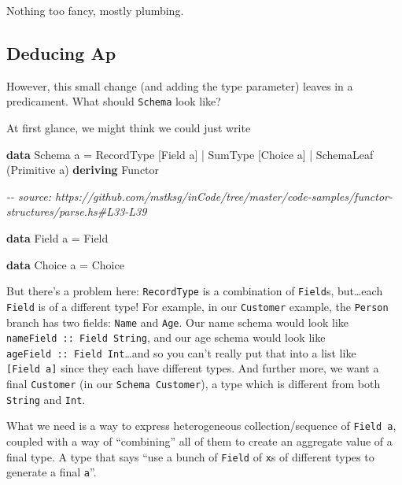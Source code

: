 \documentclass[]{article}
\newenvironment{Shaded}{}{}
\newcommand{\CommentTok}[1]{\textcolor[rgb]{0.38,0.63,0.69}{\textit{#1}}}
\newcommand{\DataTypeTok}[1]{\textcolor[rgb]{0.56,0.13,0.00}{#1}}
\newcommand{\KeywordTok}[1]{\textcolor[rgb]{0.00,0.44,0.13}{\textbf{#1}}}
\newcommand{\NormalTok}[1]{#1}
\newcommand{\OperatorTok}[1]{\textcolor[rgb]{0.40,0.40,0.40}{#1}}
\newcommand{\OtherTok}[1]{\textcolor[rgb]{0.00,0.44,0.13}{#1}}
\begin{document}
Nothing too fancy, mostly plumbing.

\hypertarget{deducing-ap}{%
\subsection{Deducing Ap}\label{deducing-ap}}

However, this small change (and adding the type parameter) leaves in a
predicament. What should \texttt{Schema} look like?

At first glance, we might think we could just write

\begin{Shaded}
\begin{Highlighting}[]
\KeywordTok{data} \DataTypeTok{Schema}\NormalTok{ a }\OtherTok{=}
      \DataTypeTok{RecordType}\NormalTok{  [}\DataTypeTok{Field}\NormalTok{ a]}
    \OperatorTok{|} \DataTypeTok{SumType}\NormalTok{     [}\DataTypeTok{Choice}\NormalTok{ a]}
    \OperatorTok{|} \DataTypeTok{SchemaLeaf}\NormalTok{  (}\DataTypeTok{Primitive}\NormalTok{ a)}
  \KeywordTok{deriving} \DataTypeTok{Functor}

\CommentTok{{-}{-} source: https://github.com/mstksg/inCode/tree/master/code{-}samples/functor{-}structures/parse.hs\#L33{-}L39}

\KeywordTok{data} \DataTypeTok{Field}\NormalTok{ a }\OtherTok{=} \DataTypeTok{Field}

\KeywordTok{data} \DataTypeTok{Choice}\NormalTok{ a }\OtherTok{=} \DataTypeTok{Choice}
\end{Highlighting}
\end{Shaded}

But there's a problem here: \texttt{RecordType} is a combination of
\texttt{Field}s, but\ldots each \texttt{Field} is of a different type! For
example, in our \texttt{Customer} example, the \texttt{Person} branch has two
fields: \texttt{Name} and \texttt{Age}. Our name schema would look like
\texttt{nameField\ ::\ Field\ String}, and our age schema would look like
\texttt{ageField\ ::\ Field\ Int}\ldots and so you can't really put that into a
list like \texttt{{[}Field\ a{]}} since they each have different types. And
further more, we want a final \texttt{Customer} (in our
\texttt{Schema\ Customer}), a type which is different from both \texttt{String}
and \texttt{Int}.

What we need is a way to express heterogeneous collection/sequence of
\texttt{Field\ a}, coupled with a way of ``combining'' all of them to create an
aggregate value of a final type. A type that says ``use a bunch of
\texttt{Field} of \texttt{x}s of different types to generate a final
\texttt{a}''.
\end{document}
